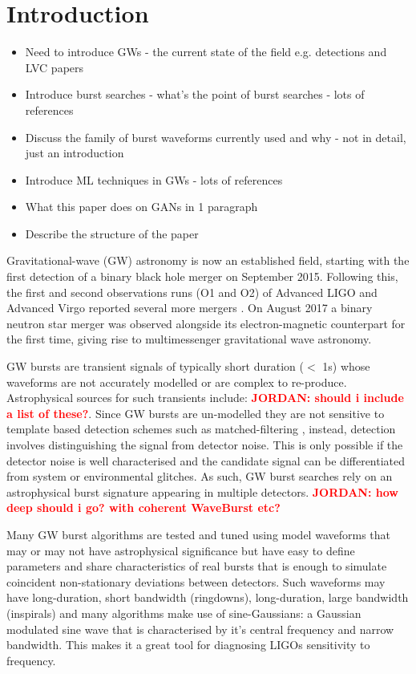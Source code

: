 \documentclass[%
 reprint,
 amsmath,amssymb,
 aps,
]{revtex4-2}
\newcommand{\jordan}[1]{\textbf{\textcolor{red}{JORDAN: #1}}}
\begin{document}

\section{Introduction}

\begin{itemize}
\item Need to introduce GWs - the current state of the field e.g. detections
and LVC papers
\item Introduce burst searches - what's the point of burst searches - lots of references
\item Discuss the family of burst waveforms currently used and why - not in detail, just
an introduction
\item Introduce ML techniques in GWs - lots of references
\item What this paper does on GANs in 1 paragraph
\item Describe the structure of the paper 
\end{itemize}

Gravitational-wave (GW) astronomy is now an established field, starting with the first detection of a binary black hole merger \cite{} on September 2015. Following this, the first and second observations runs (O1 and O2) of Advanced LIGO and Advanced Virgo reported several more mergers \cite{}. On August 2017 a binary neutron star merger was observed alongside its electron-magnetic counterpart for the first time, giving rise to multimessenger gravitational wave astronomy. 

GW bursts are transient signals of typically short duration ($<$ 1s) whose waveforms are not accurately modelled or are complex to re-produce. Astrophysical sources for such transients include: \jordan{should i include a list of these?}. Since GW bursts are un-modelled they are not sensitive to template based detection schemes such as matched-filtering \cite{}, instead, detection involves distinguishing the signal from detector noise. This is only possible if the detector noise is well characterised and the candidate signal can be differentiated from system or environmental glitches. As such, GW burst searches rely on an astrophysical burst signature appearing in multiple detectors. \jordan{how deep should i go? with coherent WaveBurst etc?}

Many GW burst algorithms \cite{cite the shit outta this} are tested and tuned using model waveforms that may or may not have astrophysical significance but have easy to define parameters and share characteristics of real bursts that is enough to simulate coincident non-stationary deviations between detectors. Such waveforms may have long-duration, short bandwidth (ringdowns), long-duration, large bandwidth (inspirals) and many algorithms make use of sine-Gaussians: a Gaussian modulated sine wave that is characterised by it's central frequency and narrow bandwidth. This makes it a great tool for diagnosing LIGOs sensitivity to frequency. 
\end{document}
